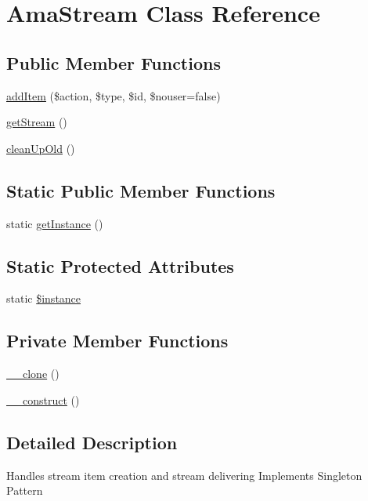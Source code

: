 \hypertarget{a00010}{}\section{Ama\+Stream Class Reference}
\label{a00010}
\subsection*{Public Member Functions}
\begin{DoxyCompactItemize}
\item 
\hyperlink{a00010_ad3461a300ecef3d09f94da67e6f89ac4}{add\+Item} (\$action, \$type, \$id, \$nouser=false)
\item 
\hyperlink{a00010_a3e5834ff3daeecd091712270886a16fb}{get\+Stream} ()
\item 
\hyperlink{a00010_ae86d23486e5db85ffa8cca4925b224da}{clean\+Up\+Old} ()
\end{DoxyCompactItemize}
\subsection*{Static Public Member Functions}
\begin{DoxyCompactItemize}
\item 
static \hyperlink{a00010_ac93fbec81f07e5d15f80db907e63dc10}{get\+Instance} ()
\end{DoxyCompactItemize}
\subsection*{Static Protected Attributes}
\begin{DoxyCompactItemize}
\item 
static \hyperlink{a00010_ad9d7ce33ebb142b70e58b68052ca0ea8}{\$instance}
\end{DoxyCompactItemize}
\subsection*{Private Member Functions}
\begin{DoxyCompactItemize}
\item 
\hyperlink{a00010_ad0cb87b388bc74d63dc884accdca8713}{\+\_\+\+\_\+clone} ()
\item 
\hyperlink{a00010_a095c5d389db211932136b53f25f39685}{\+\_\+\+\_\+construct} ()
\end{DoxyCompactItemize}


\subsection{Detailed Description}
Handles stream item creation and stream delivering Implements Singleton Pattern

